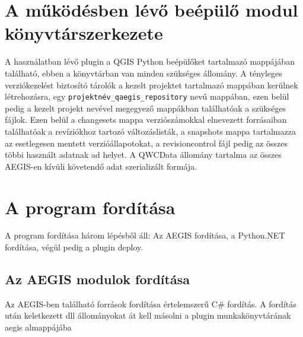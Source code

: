 \section{A működésben lévő beépülő modul könyvtárszerkezete}
A használatban lévő plugin a QGIS Python beépülőket tartalmazó mappájában található, ebben a könyvtárban van minden szükséges állomány. A tényleges verziókezelést biztosító tárolók a kezelt projektet tartalmazó mappában kerülnek létrehozásra, egy \texttt{projektnév\_qaegis\_repository} nevű mappában, ezen belül pedig a kezelt projekt nevével megegyező mappákban találhatóak a szükséges fájlok. Ezen belül a changesets mappa verziószámokkal elnevezett forrásaiban találhatóak a revíziókhoz tartozó változáslisták, a snapshots mappa tartalmazza az esetlegesen mentett verzióállapotokat, a revisioncontrol fájl pedig az összes többi használt adatnak ad helyet. A QWCData állomány tartalma az összes AEGIS-en kívüli követendő adat szerializált formája.

\section{A program fordítása}
A program fordítása három lépésből áll: Az AEGIS fordítása, a Python.NET fordítása, végül pedig a plugin deploy.
\subsection{Az AEGIS modulok fordítása}
Az AEGIS-ben található források fordítása értelemszerű C\# fordítás. A fordítás után keletkezett dll állományokat át kell másolni a plugin munkakönyvtárának aegis almappájába
